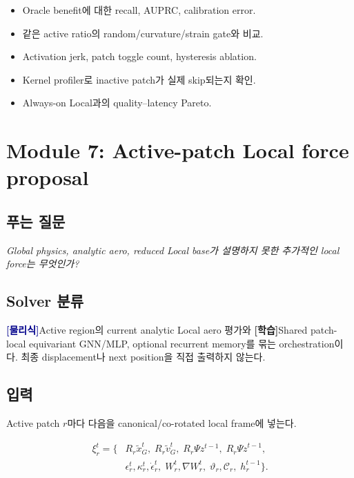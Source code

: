 \documentclass[11pt,a4paper]{article}
\newcommand{\physics}{\textcolor{darkblue}{\textbf{[물리식]}}}
\newcommand{\learned}{\textcolor{darkpurple}{\textbf{[학습]}}}
\begin{document}
\begin{itemize}[leftmargin=1.5em]
  \item Oracle benefit에 대한 recall, AUPRC, calibration error.
  \item 같은 active ratio의 random/curvature/strain gate와 비교.
  \item Activation jerk, patch toggle count, hysteresis ablation.
  \item Kernel profiler로 inactive patch가 실제 skip되는지 확인.
  \item Always-on Local과의 quality--latency Pareto.
\end{itemize}

\section{Module 7: Active-patch Local force proposal}

\subsection*{푸는 질문}

\emph{Global physics, analytic aero, reduced Local base가 설명하지 못한
추가적인 local force는 무엇인가?}

\subsection*{Solver 분류}

\physics Active region의 current analytic Local aero 평가와
\learned Shared patch-local equivariant GNN/MLP, optional recurrent memory를 묶는 orchestration이다.
최종 displacement나 next position을 직접 출력하지 않는다.

\subsection*{입력}

Active patch \(r\)마다 다음을 canonical/co-rotated local frame에 넣는다.

\begin{equation}
\begin{aligned}
  \xi_r^t=\{&
  R_r\widetilde x_G^t,\;
  R_r\widetilde v_G^t,\;
  R_r\Psi z^{t-1},\;
  R_r\Psi\dot z^{t-1},\\
  &\epsilon_r^t,\kappa_r^t,\dot\epsilon_r^t,\;
  W_r^t,\nabla W_r^t,\;
  \vartheta_r,\mathcal C_r,\;
  h_r^{t-1}\}.
\end{aligned}
\end{equation}
\end{document}
